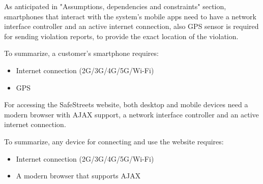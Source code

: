 As anticipated in "Assumptions, dependencies and constraints" section, smartphones that interact with the system's mobile apps need to have a network interface controller and an active internet connection, also GPS sensor is required for sending violation reports, to provide the exact location of the violation.

To summarize, a customer's smartphone requires:
\begin{itemize}
	\item Internet connection (2G/3G/4G/5G/Wi-Fi)
	\item GPS
\end{itemize}

For accessing the SafeStreets website, both desktop and mobile devices need a modern browser with AJAX support, a network interface controller and an active internet connection.

To summarize, any device for connecting and use the website requires:
\begin{itemize}
	\item Internet connection (2G/3G/4G/5G/Wi-Fi)
	\item A modern browser that supports AJAX
\end{itemize}